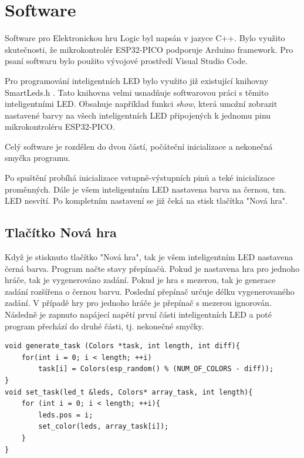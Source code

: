 \chapter{Software}
Software pro Elektronickou hru Logic byl napsán v jazyce C++. Bylo využito skutečnosti, že mikrokontrolér ESP32-PICO podporuje Arduino 
framework. Pro psaní softwaru bylo použito vývojové prostředí Visual Studio Code. %

Pro programování inteligentních LED bylo využito již existující knihovny SmartLeds.h \cite{SmartLeds}.
Tato knihovna velmi usnadňuje softwarovou práci s těmito inteligentními LED. Obsahuje například funkci {\it show}, která umožní zobrazit 
nastavené barvy na všech inteligentních LED připojených k jednomu pinu mikrokontroléru ESP32-PICO. 

Celý software je rozdělen do dvou částí, počáteční inicializace a nekonečná smyčka programu. 

Po spuštění probíhá inicializace vstupně-výstupních pinů a teké inicializace proměnných. Dále je všem inteligentním LED nastavena barva na černou,
tzn. LED nesvítí. Po kompletním nastavení se již čeká na stisk tlačítka "Nová hra". 

\section{Tlačítko Nová hra}
Když je stisknuto tlačítko "Nová hra", tak je všem inteligentním LED nastavena černá barva. Program načte stavy přepínačů. Pokud je nastavena hra pro 
jednoho hráče, tak je vygenerováno zadání. Pokud je hra s mezerou, tak je generace zadání rozšířena o černou barvu. Poslední přepínač určuje délku 
vygenerovaného zadání. V případě hry pro jednoho hráče je přepínač s mezerou ignorován. Následně je zapnuto napájecí napětí 
první části inteligentních LED a poté program přechází do druhé části, tj. nekonečné smyčky.

\begin{minipage}{\linewidth}
\begin{lstlisting}[frame=single,numbers=right,caption={Funkce pro vygenerování zadání.},label=lst:priklad.vypis.kodu.C,basicstyle=\ttfamily\small, keywordstyle=\color{black}\bfseries\underbar,]
void generate_task (Colors *task, int length, int diff){
    for(int i = 0; i < length; ++i)
        task[i] = Colors(esp_random() % (NUM_OF_COLORS - diff));
}     
void set_task(led_t &leds, Colors* array_task, int length){
    for (int i = 0; i < length; ++i){
        leds.pos = i;
        set_color(leds, array_task[i]); 
    } 
}   
\end{lstlisting}
\end{minipage} 

